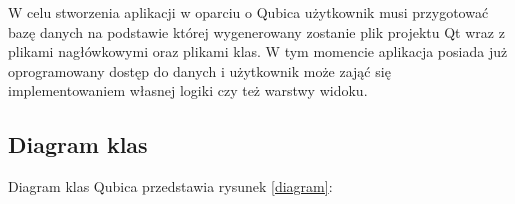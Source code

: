 \documentclass[12pt]{report}
\begin{document}
W celu stworzenia aplikacji w oparciu o Qubica użytkownik musi przygotować bazę danych na podstawie której wygenerowany zostanie plik projektu Qt wraz z plikami nagłówkowymi
oraz plikami klas. W tym momencie aplikacja posiada już oprogramowany dostęp do danych i użytkownik może zająć się implementowaniem własnej logiki czy też warstwy widoku.

\subsection{Diagram klas}

Diagram klas Qubica przedstawia rysunek \ref{diagram}:

\newpage
\noindent
\begin{minipage}{\linewidth}
\label{diagram}
\end{minipage}
\end{document}
